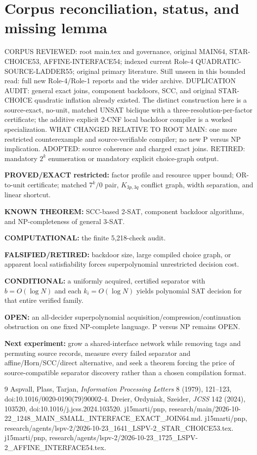 \documentclass[11pt]{article}
\begin{document}
\section{Corpus reconciliation, status, and missing lemma}
CORPUS REVIEWED: root main.tex and governance, original MAIN64, STAR-CHOICE53, AFFINE-INTERFACE54; indexed current Role-4 QUADRATIC-SOURCE-LADDER55; original primary literature. Still unseen in this bounded read: full new Role-4/Role-1 reports and the wider archive.
DUPLICATION AUDIT: general exact joins, component backdoors, SCC, and original STAR-CHOICE quadratic inflation already existed. The distinct construction here is a source-exact, no-unit, matched UNSAT biclique with a three-resolution-per-factor certificate; the additive explicit 2-CNF local backdoor compiler is a worked specialization. WHAT CHANGED RELATIVE TO ROOT MAIN: one more restricted counterexample and source-verifiable compiler; no new P versus NP implication. ADOPTED: source coherence and charged exact joins. RETIRED: mandatory $2^k$ enumeration or mandatory explicit choice-graph output.
\par\noindent\textbf{PROVED/EXACT restricted:} factor profile and resource upper bound; OR-to-unit certificate; matched $7^k/0$ pair, $K_{3p,3q}$ conflict graph, width separation, and linear shortcut.
\par\noindent\textbf{KNOWN THEOREM:} SCC-based 2-SAT, component backdoor algorithms, and NP-completeness of general 3-SAT.
\par\noindent\textbf{COMPUTATIONAL:} the finite 5,218-check audit.
\par\noindent\textbf{FALSIFIED/RETIRED:} backdoor size, large compiled choice graph, or apparent local satisfiability forces superpolynomial unrestricted decision cost.
\par\noindent\textbf{CONDITIONAL:} a uniformly acquired, certified separator with $b=O(\log N)$ and each $k_i=O(\log N)$ yields polynomial SAT decision for that entire verified family.
\par\noindent\textbf{OPEN:} an all-decider superpolynomial acquisition/compression/continuation obstruction on one fixed NP-complete language. P versus NP remains OPEN.
\par\noindent\textbf{Next experiment:} grow a shared-interface network while removing tags and permuting source records, measure every failed separator and affine/Horn/SCC/direct alternative, and seek a theorem forcing the price of source-compatible separator discovery rather than a chosen compilation format.
\begin{thebibliography}{9}
 Aspvall, Plass, Tarjan, \emph{Information Processing Letters} 8 (1979), 121--123, doi:10.1016/0020-0190(79)90002-4.
 Dreier, Ordyniak, Szeider, \emph{JCSS} 142 (2024), 103520, doi:10.1016/j.jcss.2024.103520.
 j15marti/pnp, research/main/2026-10-22\_1248\_MAIN\_SMALL\_INTERFACE\_EXACT\_JOIN64.md.
 j15marti/pnp, research/agents/lspv-2/2026-10-23\_1641\_LSPV-2\_STAR\_CHOICE53.tex.
 j15marti/pnp, research/agents/lspv-2/2026-10-23\_1725\_LSPV-2\_AFFINE\_INTERFACE54.tex.
\end{thebibliography}
\end{document}

